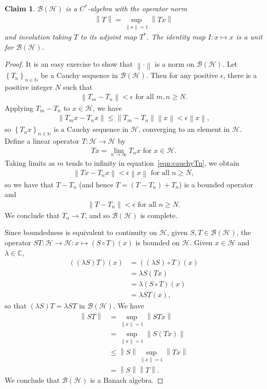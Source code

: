 \documentclass[11pt,a4paper]{report}
\theoremstyle{plain}
\newtheorem*{claim}{Claim}
\theoremstyle{definition}
\newcommand{\1}{\mathbbm{1}}
\newcommand{\C}{\mathbb{C}}
\newcommand{\N}{\mathbb{N}}
\renewcommand{\H}{\mathcal{H}}
\newcommand{\B}{\mathcal{B}}
\newcommand{\BH}{\mathcal{\B(\H)}}
\begin{document}
\begin{claim} 
	$\B(\H)$ is a $C^\ast$-algebra with the operator norm 
	\begin{align*}
		\left\|T\right\|= \sup_{\left\|x\right\|=1}{\left\|Tx\right\|}
	\end{align*}
	and involution taking $T$ to its adjoint map $T^\ast$. 
	The identity map $I:x\mapsto x$ is a unit for $\BH$.
\end{claim}
\begin{proof}
	It is an easy exercise to show that $\left\|\cdot\right\|$ is a norm on $\BH$. 
	Let $\left\{T_n\right\}_{n\in\N}$ be a Cauchy sequence in $\BH$. Then for any 
	positive $\epsilon$, there is a positive integer $N$ such that 
	\begin{align*}
		\left\|T_m-T_n\right\| < \epsilon \mbox{ for all } m,n \geq N.
	\end{align*}
	Applying $T_m-T_n$ to $x \in \H$, we have 
	\begin{align}\label{eqn:cauchyTn}
		\left\|T_mx-T_nx\right\| 	\leq \left\|T_m-T_n\right\| \left\|x\right\| 
									< \epsilon \left\|x\right\|,
	\end{align}
	so $\left\{T_n x\right\}_{n\in\N}$ is a Cauchy sequence in $\H$, converging to 
	an element in $\H$. Define a linear operator $T:\H \to \H$ by 
	\begin{align*}
		Tx= \lim_{n\to\infty}{T_nx} \mbox{ for } x \in \H.
	\end{align*}
	Taking limits as $m$ tends to infinity in equation~\eqref{eqn:cauchyTn}, we obtain
	\begin{align*}
		\left\|Tx-T_nx\right\| < \epsilon \left\|x\right\| \mbox{ for all }n \geq N,
	\end{align*}
	so we have that $T-T_n$ (and hence $T=(T-T_n)+T_n$) is a bounded operator and  
	\begin{align*}
		\left\|T-T_n\right\| <\epsilon \mbox{ for all }n \geq N.
	\end{align*}
	We conclude that $T_n \to T$, and so $\BH$ is complete.
	
	Since boundedness is equivalent to continuity on $\H$, given $S,T\in\BH$, the 
	operator $ST:\H \to \H: x \mapsto (S\circ T)(x)$ is bounded on $\H$. Given 
	$x\in\H$ and $\lambda\in\C$, 
	\begin{align*}
			((\lambda S)T)(x)
		&=	((\lambda S)\circ T)(x)															\\
		&=	\lambda S(Tx)																	\\
		&=	\lambda (S\circ T)(x)															\\
		&=	\lambda ST(x),		
	\end{align*} 
	so that $(\lambda S)T = \lambda ST$ in $\BH$. We have 
	\begin{align*}
				\left\|ST\right\|
		&=		\sup_{\left\|x\right\|=1}{\left\|STx\right\|} 								\\
		&=		\sup_{\left\|x\right\|=1}{\left\|S(Tx)\right\|} 							\\
		&\leq	\left\|S\right\| \sup_{\left\|x\right\|=1}{\left\|Tx\right\|} 				\\
		&=		\left\|S\right\| \left\|T\right\|.
	\end{align*}
	We conclude that $\BH$ is a Banach algebra.
	

\end{proof}
\end{document}
